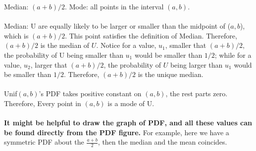 
\setcounter{theorem}{0}
\begin{exercise} [BH.6.1]

\begin{solution}
    Median: $(a+b)/2$. Mode: all points in the interval $(a,b)$.\\~\\
	Median: U are equally likely to be larger or smaller than the midpoint of ($a, b$), which is $( a + b ) / 2$. This point satisfies the definition of Median. Therefore, $( a + b ) / 2$ is the median of $U$. Notice for a value, $u_1$, smaller that $( a + b ) / 2$, the probability of U being smaller than $u_1$ would be smaller than $1/2$; while for a value, $u_2$, larger that $( a + b ) / 2$, the probability of $U$ being larger than $u_1$ would be smaller than $1/2$. Therefore, $(a+b)/2$ is the unique median. \\~\\
	Unif$(a,b)$'s PDF takes positive constant on $(a,b)$, the rest parts zero. Therefore, Every
	point in $( a, b )$ is a mode of U.\\~\\
	\textbf{It might be helpful to draw the graph of PDF, and all these values can be found directly from the PDF figure.} For example, here we have a symmetric PDF about the $\frac{a+b}{2}$, then the median and the mean coincides.
\end{solution}
\end{exercise}

